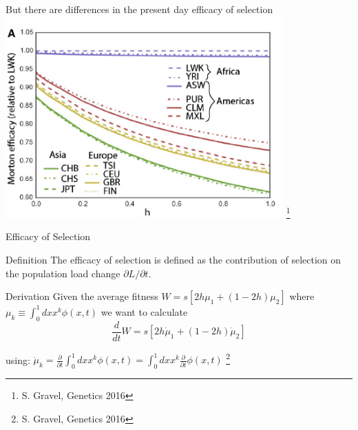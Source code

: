 \documentclass[10pt]{beamer}
\newcommand{\del}[1]{\ensuremath{\frac{\partial}{\partial #1}}}
\begin{document}
\begin{frame}{\normalsize But there are differences in the present day efficacy
    of selection} 
  \vfill
  \centering
  \includegraphics[width=0.8\textwidth]{./Figures/Gravel_efsel.png}
  \let\thefootnote\relax\footnote{S. Gravel, Genetics 2016}
\end{frame}

\begin{frame}{Efficacy of Selection}
  \begin{alertblock}{Definition}
    The efficacy of selection is defined as the contribution of selection on
    the population load change $\partial L / \partial t$.  
  \end{alertblock}
  \begin{block}{Derivation}
    Given the average fitness $W = s[2h\mu_1 + (1 - 2h)\mu_2]$ where
    $\mu_k \equiv \int_0^1 dx x^k \phi(x, t)$ we want to calculate 
    \[
      \frac{d}{dt} W= s[2h \dot \mu_1 + (1 - 2h) \dot \mu_2]
    \]
  \end{block}
  using: 
  $\dot \mu_k = \del t \int_0^1 dx x^k \phi(x, t) = \int_0^1 dx x^k \del t \phi(x, t)$
  \let\thefootnote\relax\footnote{S. Gravel, Genetics 2016}
\end{frame}
\end{document}
